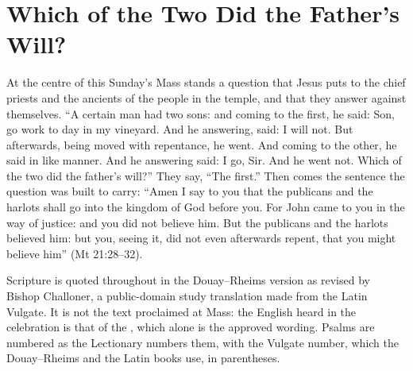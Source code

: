 \section{Which of the Two Did the Father's Will?}
\label{sec:opening}

At the centre of this Sunday's Mass stands a question that Jesus puts to the
chief priests and the ancients of the people in the temple, and that they
answer against themselves. ``A certain man had two sons: and coming to the
first, he said: Son, go work to day in my vineyard. And he answering, said: I
will not. But afterwards, being moved with repentance, he went. And coming to
the other, he said in like manner. And he answering said: I go, Sir. And he
went not. Which of the two did the father's will?'' They say, ``The first.''
Then comes the sentence the question was built to carry: ``Amen I say to you
that the publicans and the harlots shall go into the kingdom of God before
you. For John came to you in the way of justice: and you did not believe him.
But the publicans and the harlots believed him: but you, seeing it, did not
even afterwards repent, that you might believe him'' (Mt 21:28--32).

{\small\noindent Scripture is quoted throughout in the Douay--Rheims version as
revised by Bishop Challoner, a public-domain study translation made from the
Latin Vulgate. It is not the text proclaimed at Mass: the English heard in the
celebration is that of the , which alone is the approved wording. Psalms are
numbered as the Lectionary numbers them, with the Vulgate number, which the
Douay--Rheims and the Latin books use, in parentheses.\par}
\medskip

